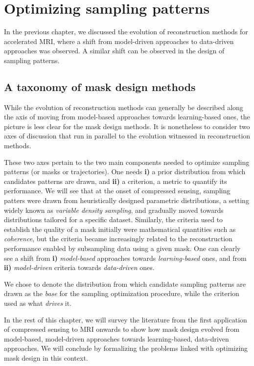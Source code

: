 \chapter{Optimizing sampling patterns}\label{ch:sampling}
In the previous chapter, we discussed the evolution of reconstruction methods for accelerated MRI, where a shift from model-driven approaches to data-driven approaches was observed. A similar shift can be observed in the design of sampling patterns. 


\section{A taxonomy of mask design methods}
While the evolution of reconstruction methods can generally be described along the axis of moving from model-based approaches towards learning-based ones, the picture is less clear for the mask design methods. It is nonetheless to consider two axes of discussion that run in parallel to the evolution witnessed in reconstruction methods. 

These two axes pertain to the two main components needed to optimize sampling patterns (or masks or trajectories). One needs \textbf{i)} a prior distribution from which candidates patterns are drawn, and \textbf{ii)} a criterion, a metric to quantify its performance. We will see that at the onset of compressed sensing, sampling patters were drawn from heuristically designed parametric distributions, a setting widely known as \textit{variable density sampling}, and gradually moved towards distributions tailored for a specific dataset. Similarly, the criteria used to establish the quality of a mask initially were mathematical quantities such as \textit{coherence}, but the criteria became increasingly related to the reconstruction performance enabled by subsampling data using a given mask. One can clearly see a shift from \textbf{i)} \textit{model-based} approaches towards \textit{learning-based} ones, and from \textbf{ii)} \textit{model-driven} criteria towards \textit{data-driven} ones. 

\begin{remark} 
    We chose to denote the distribution from which candidate sampling patterns are drawn as the \textit{base} for the sampling optimization procedure, while the criterion used as what \textit{drives} it. 
\end{remark}

In the rest of this chapter, we will survey the literature from the first application of compressed sensing to MRI onwards to show how mask design evolved from model-based, model-driven approaches towards learning-based, data-driven approaches. We will conclude by formalizing the problems linked with optimizing mask design in this context.


